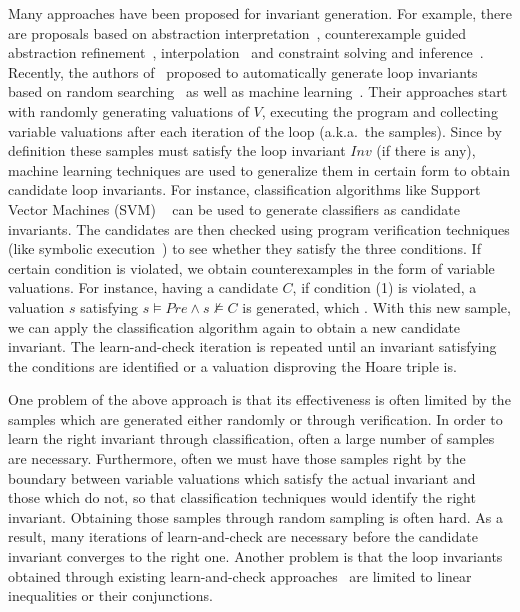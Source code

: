 Many approaches have been proposed for invariant generation. 
For example, there are proposals based on abstraction interpretation~\cite{cousot1978automatic,mine2006octagon,cousot1979systematic,karr1976affine,vincent2009subpolyhedra}, counterexample guided abstraction refinement~\cite{henzinger2003software,thomas2001slam,edmund2003counterexample}, interpolation~\cite{kenneth2010lazy,thomas2004abstractions,kenneth2003interpolation,Kenneth2006lazy} and constraint solving and inference~\cite{ashutosh2009invgen,michael2003linear,sumit2009constraint}. 
Recently, the authors of~\cite{sharma2012interpolants,sharma2013verification,sharma2014invariant} proposed to automatically generate loop invariants based on random searching~\cite{sharma2014invariant} as well as machine learning~\cite{sharma2012interpolants}. 
Their approaches start with randomly generating valuations of $V$, executing the program and collecting variable valuations after each iteration of the loop (a.k.a.~the samples). 
Since by definition these samples must satisfy the loop invariant $\mathit{Inv}$ (if there is any), machine learning techniques are used to generalize them in certain form to obtain candidate loop invariants. 
For instance, classification algorithms like Support Vector Machines (SVM) ~\cite{sharma2012interpolants,sharma2013verification} can be used to generate classifiers as candidate invariants. 
The candidates are then checked using program verification techniques (like symbolic execution~\cite{symbolic}) to see whether they satisfy the three conditions. If certain condition is violated, we obtain counterexamples in the form of variable valuations. 
For instance, having a candidate $C$, if condition (1) is violated, a valuation $s$ satisfying $s \models Pre \land s \not \models C$ is generated, which . 
With this new sample, we can apply the classification algorithm again to obtain a new candidate invariant. The learn-and-check iteration is repeated until an invariant satisfying the conditions are identified or a valuation disproving the Hoare triple is.

One problem of the above approach is that its effectiveness is often limited by the samples which are generated either randomly or through verification. In order to learn the right invariant through classification, often a large number of samples are necessary. Furthermore, often we must have those samples right by the boundary between variable valuations which satisfy the actual invariant and those which do not, so that classification techniques would identify the right invariant. Obtaining those samples through random sampling is often hard. As a result, many iterations of learn-and-check are necessary before the candidate invariant converges to the right one. Another problem is that the loop invariants obtained through existing learn-and-check approaches~\cite{sharma2012interpolants,sharma2013verification,sharma2014invariant} are limited to linear inequalities or their conjunctions.

